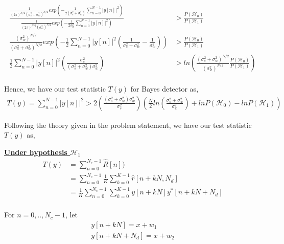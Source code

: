 \documentclass[a4 paper]{article}
\begin{document}
\begin{align*}
	\frac{\frac{1}{(2\pi)^{N/2}(\sigma_{s}^{2} + \sigma_{w}^{2})^{N/2}} exp \left(-\frac{1}{2(\sigma_{s}^{2} + \sigma_{w}^{2} )} \sum_{n=0}^{N-1} \vert y[n] \vert ^{2} \right)}{\frac{1}{(2\pi)^{N/2}(\sigma_{w}^{2})^{N/2}} exp \left(-\frac{1}{2\sigma_{w}^{2}} \sum_{n=0}^{N-1} \vert y[n] \vert ^{2} \right)} &> \frac{P(\mathcal{H}_{0})}{P(\mathcal{H}_{1})}	\\
	\frac{(\sigma_{w}^{2})^{N/2}}{(\sigma_{s}^{2} + \sigma_{w}^{2})^{N/2}} exp \left(-\frac{1}{2} \sum_{n=0}^{N-1} \vert y[n] \vert ^{2} \left(\frac{1}{\sigma_{s}^{2} + \sigma_{w}^{2}} - \frac{1}{\sigma_{w}^{2}}\right) \right) &> \frac{P(\mathcal{H}_{0})}{P(\mathcal{H}_{1})} \\
	\frac{1}{2} \sum_{n=0}^{N-1} \vert y[n] \vert ^{2} \left(\frac{\sigma_{s}^{2}}{(\sigma_{s}^{2} + \sigma_{w}^{2}) \sigma_{w}^{2}} \right) &> ln \left( \frac{(\sigma_{s}^{2} + \sigma_{w}^{2})^{N/2}}{(\sigma_{w}^{2})^{N/2}}   	\frac{P(\mathcal{H}_{0})}{P(\mathcal{H}_{1})} \right)	\\   
\end{align*}

Hence, we have our test statistic $T(y)$ for Bayes detector as,
\begin{align*}
	T(y) = \sum_{n=0}^{N-1} \vert y[n] \vert ^{2} > 2 \left(\frac{(\sigma_{s}^{2} + \sigma_{w}^{2}) \sigma_{w}^{2}}{\sigma_{s}^{2}} \right) \left( \frac{N}{2} ln \left( \frac{\sigma_{s}^{2} + \sigma_{w}^{2}}{\sigma_{w}^{2}} \right) + ln P(\mathcal{H}_{0}) - ln P(\mathcal{H}_{1}) \right) 
\end{align*}


\newpage
{}
\vspace{-2em}
\solution Following the theory given in the problem statement, we have our test statistic $T(y)$ as,

\underline{\textbf{Under hypothesis $\mathcal{H}_{1}$}}	\\
\begin{align*}
	T(y) &= \sum_{n=0}^{N_{c}-1} \hat{R}[n])	\\
		&= \sum_{n=0}^{N_{c}-1} \frac{1}{K} \sum_{k=0}^{K-1} \hat{r}[n+kN, N_{d}]	\\
		&= \frac{1}{K} \sum_{n=0}^{N_{c}-1} \sum_{k=0}^{K-1} y[n+kN] y^{*} [n+kN+N_{d}]	\\
\end{align*}

For $n=0, .., N_{c} -1$, let
\begin{align*}
	y[n+kN] = x + w_{1}	\\
	y[n+kN+N_{d}] = x + w_{2}
\end{align*}
\end{document}
